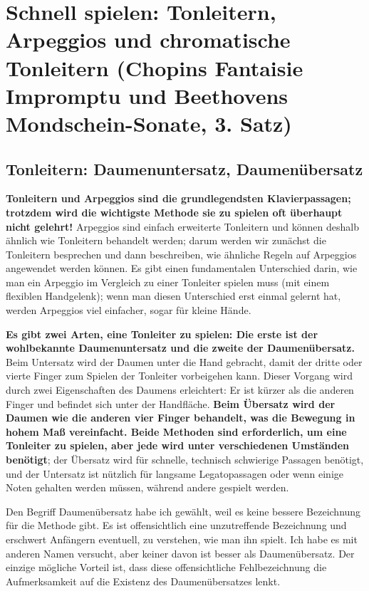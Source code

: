 
\section{Schnell spielen: Tonleitern, Arpeggios und chromatische Tonleitern (Chopins Fantaisie Impromptu und Beethovens Mondschein-Sonate, 3. Satz)}
\label{c1iii5}

\subsection{Tonleitern: Daumenuntersatz, Daumenübersatz}
\label{c1iii5a}

\textbf{Tonleitern und Arpeggios sind die grundlegendsten Klavierpassagen; trotzdem wird die wichtigste Methode sie zu spielen oft überhaupt nicht gelehrt!}
Arpeggios sind einfach erweiterte Tonleitern und können deshalb ähnlich wie Tonleitern behandelt werden; darum werden wir zunächst die Tonleitern besprechen und dann beschreiben, wie ähnliche Regeln auf Arpeggios angewendet werden können.
Es gibt einen fundamentalen Unterschied darin, wie man ein Arpeggio im Vergleich zu einer Tonleiter spielen muss (mit einem flexiblen Handgelenk); wenn man diesen Unterschied erst einmal gelernt hat, werden Arpeggios viel einfacher, sogar für kleine Hände.

\textbf{Es gibt zwei Arten, eine Tonleiter zu spielen: Die erste ist der wohlbekannte Daumenuntersatz und die zweite der Daumenübersatz.}
Beim Untersatz wird der Daumen unter die Hand gebracht, damit der dritte oder vierte Finger zum Spielen der Tonleiter vorbeigehen kann.
Dieser Vorgang wird durch zwei Eigenschaften des Daumens erleichtert: Er ist kürzer als die anderen Finger und befindet sich unter der Handfläche.
\textbf{Beim Übersatz wird der Daumen wie die anderen vier Finger behandelt, was die Bewegung in hohem Maß vereinfacht.
Beide Methoden sind erforderlich, um eine Tonleiter zu spielen, aber jede wird unter verschiedenen Umständen benötigt}; der Übersatz wird für schnelle, technisch schwierige Passagen benötigt, und der Untersatz ist nützlich für langsame Legatopassagen oder wenn einige Noten gehalten werden müssen, während andere gespielt werden.

Den Begriff Daumenübersatz habe ich gewählt, weil es keine bessere Bezeichnung für die Methode gibt.
Es ist offensichtlich eine unzutreffende Bezeichnung und erschwert Anfängern eventuell, zu verstehen, wie man ihn spielt.
Ich habe es mit anderen Namen versucht, aber keiner davon ist besser als Daumenübersatz.
Der einzige mögliche Vorteil ist, dass diese offensichtliche Fehlbezeichnung die Aufmerksamkeit auf die Existenz des Daumenübersatzes lenkt.

